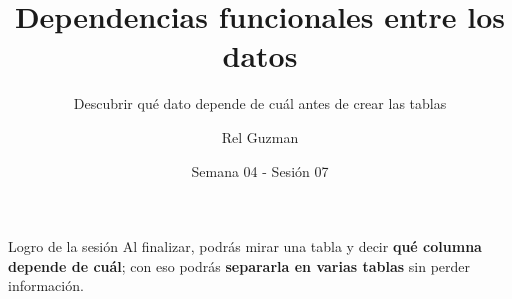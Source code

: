 \documentclass[aspectratio=169,10pt,c]{beamer}
\title{Dependencias funcionales entre los datos}
\subtitle{Descubrir qué dato depende de cuál antes de crear las tablas}
\date{Semana 04 - Sesión 07}
\author{Rel Guzman}
\begin{document}
{\maketitle}

\begin{frame}[c]
\begin{block}{Logro de la sesión}
Al finalizar, podrás mirar una tabla y decir \textbf{qué columna depende de cuál}; con eso podrás \textbf{separarla en varias tablas} sin perder información.
\end{block}
\end{frame}

\end{document}
